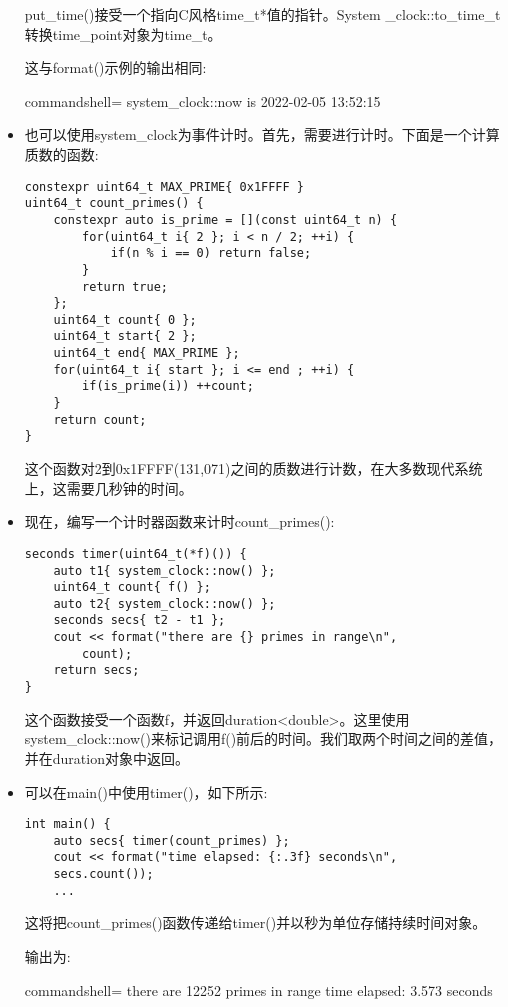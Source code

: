 \begin{itemize}
put\_time()接受一个指向C风格time\_t*值的指针。System \_clock::to\_time\_t转换time\_point对象为time\_t。

这与format()示例的输出相同:

\begin{tcblisting}{commandshell={}}
system_clock::now is 2022-02-05 13:52:15
\end{tcblisting}

\item 
也可以使用system\_clock为事件计时。首先，需要进行计时。下面是一个计算质数的函数:

\begin{lstlisting}[style=styleCXX]
constexpr uint64_t MAX_PRIME{ 0x1FFFF }
uint64_t count_primes() {
	constexpr auto is_prime = [](const uint64_t n) {
		for(uint64_t i{ 2 }; i < n / 2; ++i) {
			if(n % i == 0) return false;
		}
		return true;
	};
	uint64_t count{ 0 };
	uint64_t start{ 2 };
	uint64_t end{ MAX_PRIME };
	for(uint64_t i{ start }; i <= end ; ++i) {
		if(is_prime(i)) ++count;
	}
	return count;
}
\end{lstlisting}

这个函数对2到0x1FFFF(131,071)之间的质数进行计数，在大多数现代系统上，这需要几秒钟的时间。

\item 
现在，编写一个计时器函数来计时count\_primes():

\begin{lstlisting}[style=styleCXX]
seconds timer(uint64_t(*f)()) {
	auto t1{ system_clock::now() };
	uint64_t count{ f() };
	auto t2{ system_clock::now() };
	seconds secs{ t2 - t1 };
	cout << format("there are {} primes in range\n",
		count);
	return secs;
}
\end{lstlisting}

这个函数接受一个函数f，并返回duration<double>。这里使用system\_clock::now()来标记调用f()前后的时间。我们取两个时间之间的差值，并在duration对象中返回。

\item 
可以在main()中使用timer()，如下所示:

\begin{lstlisting}[style=styleCXX]
int main() {
	auto secs{ timer(count_primes) };
	cout << format("time elapsed: {:.3f} seconds\n",
	secs.count());
	...
\end{lstlisting}

这将把count\_primes()函数传递给timer()并以秒为单位存储持续时间对象。

输出为:

\begin{tcblisting}{commandshell={}}
there are 12252 primes in range
time elapsed: 3.573 seconds
\end{tcblisting}


\end{itemize}
